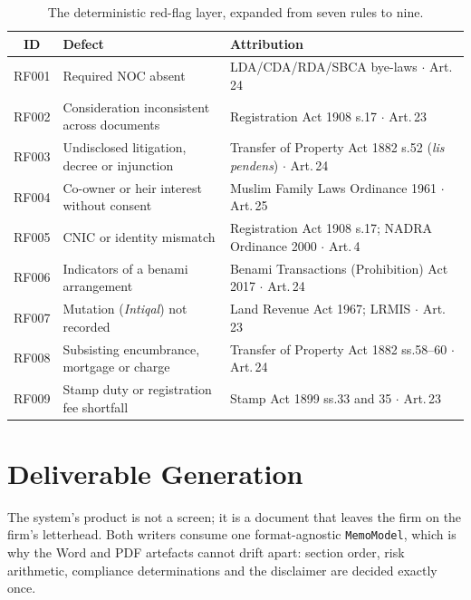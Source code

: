 \documentclass[11pt,a4paper]{article}
\newcommand{\code}[1]{\texttt{\small #1}}
\begin{document}
\begin{table}[H]
\centering\footnotesize
\begin{tabularx}{\linewidth}{@{}>{\ttfamily}c L{4.4cm} X@{}}
\toprule
{}\normalfont\textbf{ID} & \textbf{Defect} & \textbf{Attribution} \\
\midrule
RF001 & Required NOC absent                       & LDA/CDA/RDA/SBCA bye-laws $\cdot$ Art.\,24 \\
RF002 & Consideration inconsistent across documents & Registration Act 1908 s.17 $\cdot$ Art.\,23 \\
RF003 & Undisclosed litigation, decree or injunction & Transfer of Property Act 1882 s.52 (\emph{lis pendens}) $\cdot$ Art.\,24 \\
RF004 & Co-owner or heir interest without consent & Muslim Family Laws Ordinance 1961 $\cdot$ Art.\,25 \\
RF005 & CNIC or identity mismatch                 & Registration Act 1908 s.17; NADRA Ordinance 2000 $\cdot$ Art.\,4 \\
RF006 & Indicators of a benami arrangement        & Benami Transactions (Prohibition) Act 2017 $\cdot$ Art.\,24 \\
RF007 & Mutation (\emph{Intiqal}) not recorded    & Land Revenue Act 1967; LRMIS $\cdot$ Art.\,23 \\
RF008 & Subsisting encumbrance, mortgage or charge & Transfer of Property Act 1882 ss.58--60 $\cdot$ Art.\,24 \\
RF009 & Stamp duty or registration fee shortfall  & Stamp Act 1899 ss.33 and 35 $\cdot$ Art.\,23 \\
\bottomrule
\end{tabularx}
\caption{The deterministic red-flag layer, expanded from seven rules to nine.}
\end{table}

\section{Deliverable Generation}

The system's product is not a screen; it is a document that leaves the firm on the firm's
letterhead. Both writers consume one format-agnostic \code{MemoModel}, which is why the
Word and PDF artefacts cannot drift apart: section order, risk arithmetic, compliance
determinations and the disclaimer are decided exactly once.
\end{document}
